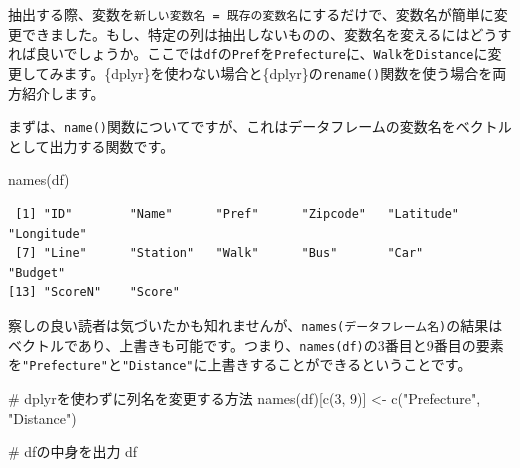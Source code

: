 \documentclass[
  a4paper,
  pandoc,
  ja=standard,
  jafont=haranoaji]{bxjsbook}
\newenvironment{Shaded}{\begin{snugshade}}{\end{snugshade}}
\newcommand{\CommentTok}[1]{\textcolor[rgb]{0.37,0.37,0.37}{#1}}
\newcommand{\DecValTok}[1]{\textcolor[rgb]{0.68,0.00,0.00}{#1}}
\newcommand{\FunctionTok}[1]{\textcolor[rgb]{0.28,0.35,0.67}{#1}}
\newcommand{\NormalTok}[1]{\textcolor[rgb]{0.00,0.48,0.65}{#1}}
\newcommand{\OtherTok}[1]{\textcolor[rgb]{0.00,0.48,0.65}{#1}}
\newcommand{\StringTok}[1]{\textcolor[rgb]{0.13,0.47,0.30}{#1}}
\begin{document}
抽出する際、変数を\texttt{新しい変数名\ =\ 既存の変数名}にするだけで、変数名が簡単に変更できました。もし、特定の列は抽出しないものの、変数名を変えるにはどうすれば良いでしょうか。ここでは\texttt{df}の\texttt{Pref}を\texttt{Prefecture}に、\texttt{Walk}を\texttt{Distance}に変更してみます。\{dplyr\}を使わない場合と\{dplyr\}の\texttt{rename()}関数を使う場合を両方紹介します。

まずは、\texttt{name()}関数についてですが、これはデータフレームの変数名をベクトルとして出力する関数です。

\begin{Shaded}
\begin{Highlighting}[numbers=left,,]
\FunctionTok{names}\NormalTok{(df)}
\end{Highlighting}
\end{Shaded}

\begin{verbatim}
 [1] "ID"        "Name"      "Pref"      "Zipcode"   "Latitude"  "Longitude"
 [7] "Line"      "Station"   "Walk"      "Bus"       "Car"       "Budget"   
[13] "ScoreN"    "Score"    
\end{verbatim}

察しの良い読者は気づいたかも知れませんが、\texttt{names(データフレーム名)}の結果はベクトルであり、上書きも可能です。つまり、\texttt{names(df)}の3番目と9番目の要素を\texttt{"Prefecture"}と\texttt{"Distance"}に上書きすることができるということです。

\begin{Shaded}
\begin{Highlighting}[numbers=left,,]
\CommentTok{\# dplyrを使わずに列名を変更する方法}
\FunctionTok{names}\NormalTok{(df)[}\FunctionTok{c}\NormalTok{(}\DecValTok{3}\NormalTok{, }\DecValTok{9}\NormalTok{)] }\OtherTok{\textless{}{-}} \FunctionTok{c}\NormalTok{(}\StringTok{"Prefecture"}\NormalTok{, }\StringTok{"Distance"}\NormalTok{)}

\CommentTok{\# dfの中身を出力}
\NormalTok{df}
\end{Highlighting}
\end{Shaded}
\end{document}
